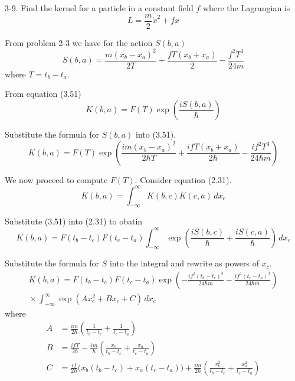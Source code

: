 \documentclass[12pt]{article}
\begin{document}
3-9.
Find the kernel for a particle in a constant field $f$
where the Lagrangian is
\begin{equation*}
L=\frac{m}{2}\dot x^2+fx
\end{equation*}

From problem 2-3 we have for the action $S(b,a)$
\begin{equation*}
S(b,a)=\frac{m(x_b-x_a)^2}{2T}+\frac{fT(x_b+x_a)}{2}-\frac{f^2T^3}{24m}
\end{equation*}
where $T=t_b-t_a$.

\bigskip
From equation (3.51)
\begin{equation*}
K(b,a)=F(T)\exp\left(\frac{iS(b,a)}{\hbar}\right)
\tag{3.51}
\end{equation*}

Substitute the formula for $S(b,a)$ into (3.51).
\begin{equation*}
K(b,a)=
F(T)\exp\left(
\frac{im(x_b-x_a)^2}{2\hbar T}
+\frac{ifT(x_b+x_a)}{2\hbar}
-\frac{if^2T^3}{24\hbar m}
\right)
\tag{1}
\end{equation*}

We now proceed to compute $F(T)$.
Consider equation (2.31).
\begin{equation*}
K(b,a)=\int_{-\infty}^\infty K(b,c)K(c,a)\,dx_c
\tag{2.31}
\end{equation*}

Substitute (3.51) into (2.31) to obatin
\begin{equation*}
K(b,a)=F(t_b-t_c)F(t_c-t_a)\int_{-\infty}^\infty
\exp\left(\frac{iS(b,c)}{\hbar}+\frac{iS(c,a)}{\hbar}\right)
\,dx_c
\end{equation*}

Substitute the formula for $S$ into the integral
and rewrite as powers of $x_c$.
\begin{multline*}
K(b,a)=F(t_b-t_c)F(t_c-t_a)
\exp\left(-\frac{if^2(t_b-t_c)^3}{24\hbar m}-\frac{if^2(t_c-t_a)^3}{24\hbar m}\right)
\\[1ex]
{}\times
\int_{-\infty}^\infty
\exp\left(Ax_c^2+Bx_c+C\right)
\,dx_c
\tag{2}
\end{multline*}
where
\begin{align*}
A&=\frac{im}{2\hbar}\left(\frac{1}{t_b-t_c}+\frac{1}{t_c-t_a}\right)
\tag{3}
\\
B&=\frac{ifT}{2\hbar}-\frac{im}{\hbar}\left(\frac{x_b}{t_b-t_c}+\frac{x_a}{t_c-t_a}\right)
\tag{4}
\\
C&=\frac{if}{2\hbar}\big(x_b(t_b-t_c)+x_a(t_c-t_a)\big)+\frac{im}{2\hbar}
\left(\frac{x_b^2}{t_b-t_c}+\frac{x_a^2}{t_c-t_a}\right)
\tag{5}
\end{align*}
\end{document}

